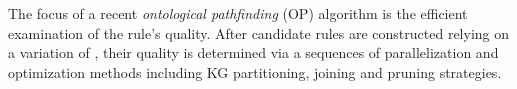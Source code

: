 The focus of a recent %
 \emph{ontological pathfinding} (OP) \cite{op} algorithm is %
the efficient examination of the rule's quality. %
After candidate rules are constructed relying on a variation of \cite{DBLP:conf/aaai/RichardsM92}, their quality is determined via a sequences of parallelization and optimization methods including KG partitioning, joining and pruning strategies.




